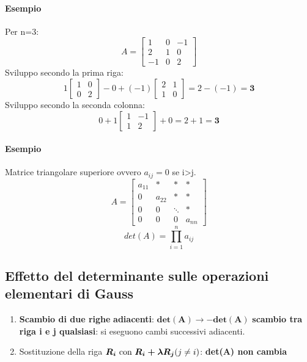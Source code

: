 \documentclass[a4paper, 12pt]{report}
\begin{document}
    \paragraph{Esempio} Per n=3:
    $$
    A=
    \begin{bmatrix}
        1 & 0 & -1\\
        2 & 1 & 0\\
        -1 & 0 & 2
    \end{bmatrix}
    $$
    Sviluppo secondo la prima riga:
    $$
    1
    \begin{bmatrix}
        1 & 0\\
        0 & 2
    \end{bmatrix}
    - 0 + (-1)
    \begin{bmatrix}
        2 & 1\\
        1 & 0
    \end{bmatrix}
    =2-(-1)=\boldsymbol{3}
    $$
    Sviluppo secondo la seconda colonna:
    $$
    0 + 1 
    \begin{bmatrix}
        1 & -1\\
        1 & 2
    \end{bmatrix}
    + 0=2+1=\boldsymbol{3}
    $$
    \paragraph{Esempio} Matrice triangolare superiore ovvero $a_{ij}=0$ se i>j.
    $$
    A=
    \begin{bmatrix}
        a_{11}&*&*&*\\
        0&a_{22}&*&*\\
        0&0&\ddots&*\\
        0&0&0&a_{nn}
    \end{bmatrix}
    $$
    $$det(A)=\prod_{i=1}^{n}a_{ij}$$
    \subsection{Effetto del determinante sulle operazioni elementari di Gauss}
    \begin{enumerate}
        \item \textbf{Scambio di due righe}
            \subitem \textbf{adiacenti}: $\boldsymbol{det(A)\rightarrow -det(A)}$
            \subitem \textbf{scambio tra riga i e j qualsiasi}: si eseguono cambi successivi adiacenti.
        \item Sostituzione della riga $\boldsymbol{R_i$ con $R_i+\lambda R_j} (j \neq i)$: \textbf{det(A) non cambia}
    \end{enumerate}
\end{document}
